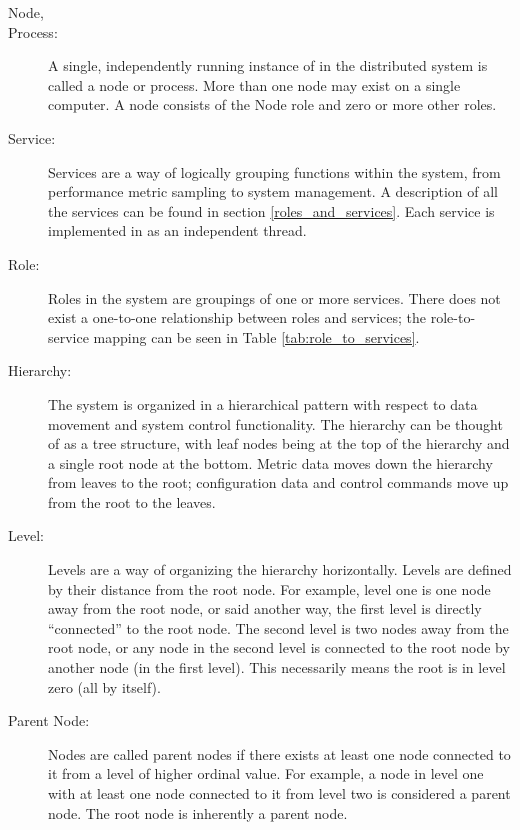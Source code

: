 \begin{description}
\item[\dcamp Node,]
\item[\dcamp Process:]
A single, independently running instance of \dcamp in the distributed system is called a \dcamp node or process. More
than one node may exist on a single computer. A node consists of the Node role and zero or more other \dcamp roles. 

\item[\dcamp Service:]
Services are a way of logically grouping functions within the \dcamp system, from performance metric sampling to \dcamp
system management. A description of all the \dcamp services can be found in section \ref{roles_and_services}. Each
service is implemented in \dcamp as an independent thread.

\item[\dcamp Role:]
Roles in the \dcamp system are groupings of one or more \dcamp services. There does not exist a one-to-one
relationship between roles and services; the \dcamp role-to-service mapping can be seen in Table
\ref{tab:role_to_services}.

\item[\dcamp Hierarchy:]
The \dcamp system is organized in a hierarchical pattern with respect to data movement and system control functionality.
The hierarchy can be thought of as a tree structure, with leaf nodes being at the top of the hierarchy and a single root
node at the bottom. Metric data moves down the hierarchy from leaves to the root; configuration data and control
commands move up from the root to the leaves. 

\item[\dcamp Level:]
Levels are a way of organizing the \dcamp hierarchy horizontally. Levels are defined by their distance from the root
node. For example, level one is one node away from the root node, or said another way, the first level is directly
``connected'' to the root node. The second level is two nodes away from the root node, or any node in the second level is
connected to the root node by another node (in the first level). This necessarily means the root is in level zero (all
by itself).

\item[Parent Node:]
Nodes are called parent nodes if there exists at least one node connected to it from a level of higher ordinal value.
For example, a node in level one with at least one node connected to it from level two is considered a parent node. The
root node is inherently a parent node. 


\end{description}
